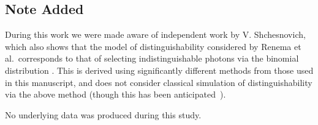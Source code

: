 \subsection{Note Added}

During this work we were made aware of independent work by V. Shchesnovich, which also shows that the model of distinguishability considered by Renema et al.\ corresponds to that of selecting indistinguishable photons via the binomial distribution \cite{shchesnovich2019}. 
This is derived using significantly different methods from those used in this manuscript, and does not consider classical simulation of distinguishability via the above method (though this has been anticipated~\cite{shchesnovich2019clifford}).

No underlying data was produced during this study.